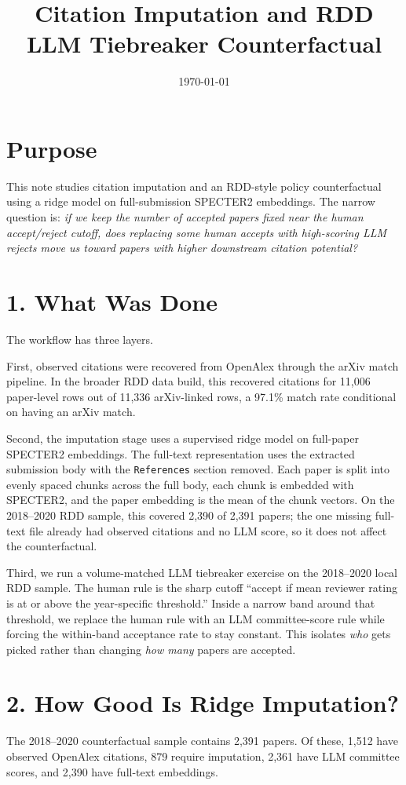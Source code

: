 \documentclass[11pt]{article}
\title{Citation Imputation and RDD LLM Tiebreaker Counterfactual}
\author{}
\date{\today}
\begin{document}
\maketitle

\section*{Purpose}
This note studies citation imputation and an RDD-style policy counterfactual
using a ridge model on full-submission SPECTER2 embeddings. The narrow
question is:
\emph{if we keep the number of accepted papers fixed near the human
accept/reject cutoff, does replacing some human accepts with high-scoring LLM
rejects move us toward papers with higher downstream citation potential?}

\section*{1. What Was Done}
The workflow has three layers.

First, observed citations were recovered from OpenAlex through the arXiv match
pipeline. In the broader RDD data build, this recovered citations for
11{,}006 paper-level rows out of 11{,}336 arXiv-linked rows, a 97.1\% match
rate conditional on having an arXiv match.

Second, the imputation stage uses a supervised ridge model on full-paper
SPECTER2 embeddings. The full-text representation uses the
extracted submission body with the \texttt{References} section removed. Each
paper is split into evenly spaced chunks across the full body, each chunk is
embedded with SPECTER2, and the paper embedding is the mean of the chunk
vectors. On the 2018--2020 RDD sample, this covered 2{,}390 of 2{,}391 papers;
the one missing full-text file already had observed citations and no LLM score,
so it does not affect the counterfactual.

Third, we run a volume-matched LLM tiebreaker exercise on the 2018--2020 local
RDD sample. The human rule is the sharp cutoff ``accept if mean reviewer
rating is at or above the year-specific threshold.'' Inside a narrow band
around that threshold, we replace the human rule with an LLM committee-score
rule while forcing the within-band acceptance rate to stay constant. This
isolates \emph{who} gets picked rather than changing \emph{how many} papers are
accepted.

\section*{2. How Good Is Ridge Imputation?}
The 2018--2020 counterfactual sample contains 2{,}391 papers. Of these, 1{,}512
have observed OpenAlex citations, 879 require imputation, 2{,}361 have LLM
committee scores, and 2{,}390 have full-text embeddings.
\end{document}
